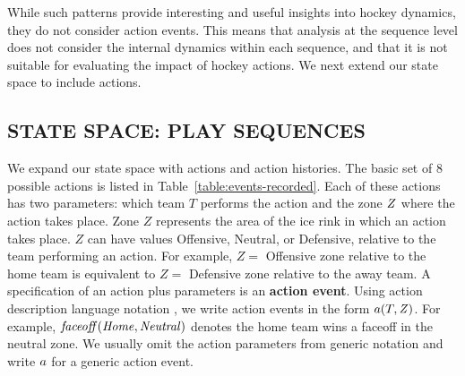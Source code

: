 \documentclass[]{article}
\begin{document}
\begin{enumerate}
\end{enumerate}

While such patterns provide interesting and useful insights into hockey dynamics, they do not consider action events. This means that analysis at the sequence level does not consider the internal dynamics within each sequence, and that it is not suitable for evaluating the impact of hockey actions. We next extend our state space to include actions.

\subsection{STATE SPACE: PLAY SEQUENCES}
\label{subsec:play-sequences}

We expand our state space with actions and action histories. The basic set of 8 possible actions is listed in Table~\ref{table:events-recorded}. Each of these actions has two parameters: which team $T$ performs the action and the zone $\it{Z}$ where the action takes place. Zone $Z$ represents the area of the ice rink in which an action takes place. $Z$ can have values Offensive, Neutral, or Defensive, relative to the team performing an action. For example, $Z = $ Offensive zone relative to the home team is equivalent to $Z = $ Defensive zone relative to the away team. A specification of an action plus parameters is an \textbf{action event}. Using action description language notation \citep{bib:LevesquePirriReiter98}, we write action events in the form $a(T,\it{Z})$. For example, $\it{faceoff}(\it{Home},\it{Neutral})$ denotes the home team wins a faceoff in the neutral zone. We usually omit the action parameters from generic notation and write $a$ for a generic action event.
\end{document}
